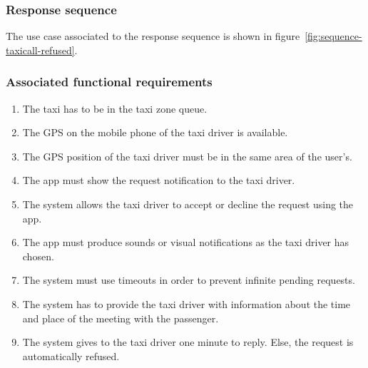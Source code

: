 \subsubsection{Response sequence}
The use case associated to the response sequence is shown in figure~\ref{fig:sequence-taxicall-refused}.

\subsubsection{Associated functional requirements}
\begin{enumerate}
\item The taxi has to be in the taxi zone queue.
\item The GPS on the mobile phone of the taxi driver is available.
\item The GPS position of the taxi driver must be in the same area of the user's.
\item The app must show the request notification to the taxi driver.
\item The system allows the taxi driver to accept or decline the request using the app.
\item The app must produce sounds or visual notifications as the taxi driver has chosen.
\item The system must use timeouts in order to prevent infinite pending requests.
\item The system has to provide the taxi driver with information about the time and place of the meeting with the passenger.
\item The system gives to the taxi driver one minute to reply. Else, the request is automatically refused.
\end{enumerate}
